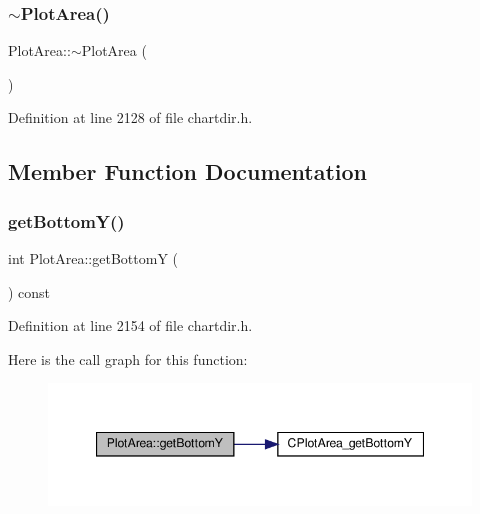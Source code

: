 \subsubsection{\texorpdfstring{$\sim$\+Plot\+Area()}{~PlotArea()}}
{\footnotesize\ttfamily Plot\+Area\+::$\sim$\+Plot\+Area (\begin{DoxyParamCaption}{ }\end{DoxyParamCaption})\hspace{0.3cm}{\ttfamily [inline]}}



Definition at line 2128 of file chartdir.\+h.



\subsection{Member Function Documentation}
\mbox{\label{class_plot_area_ac11438738fc19e074cc74c65bece8583}} 
\subsubsection{\texorpdfstring{get\+Bottom\+Y()}{getBottomY()}}
{\footnotesize\ttfamily int Plot\+Area\+::get\+BottomY (\begin{DoxyParamCaption}{ }\end{DoxyParamCaption}) const\hspace{0.3cm}{\ttfamily [inline]}}



Definition at line 2154 of file chartdir.\+h.

Here is the call graph for this function\+:
\nopagebreak
\begin{figure}[H]
\begin{center}
\leavevmode
\includegraphics[width=347pt]{class_plot_area_ac11438738fc19e074cc74c65bece8583_cgraph}
\end{center}
\end{figure}
\mbox{\label{class_plot_area_a2325837475a874fe9b8eff161422f973}} 
